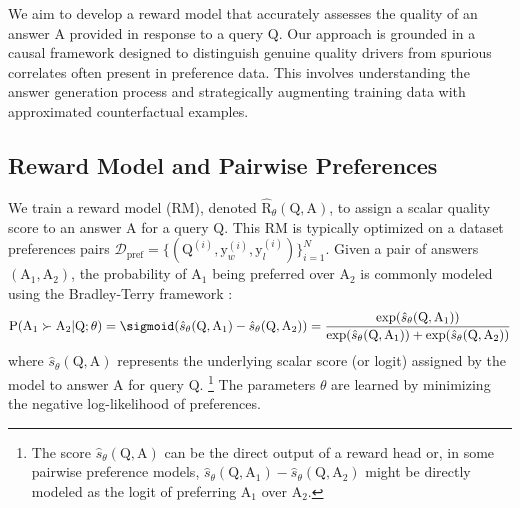 
\vspace{-0.05in}
We aim to develop a reward model that accurately assesses the quality of an answer $\mathrm{A}$ provided in response to a query $\mathrm{Q}$. Our approach is grounded in a causal framework designed to distinguish genuine quality drivers from spurious correlates often present in preference data. This involves understanding the answer generation process and strategically augmenting training data with approximated counterfactual examples.

\vspace{-0.1in}
\subsection{Reward Model and Pairwise Preferences}
We train a reward model (RM), denoted $\hat{\mathrm{R}}_\theta(\mathrm{Q}, \mathrm{A})$, to assign a scalar quality score to an answer $\mathrm{A}$ for a query $\mathrm{Q}$. This RM is typically optimized on a dataset  preferences pairs $\mathcal{D}_{\mathrm{pref}} = \{(\mathrm{Q}^{(i)}, \mathrm{y}_w^{(i)}, \mathrm{y}_l^{(i)})\}_{i=1}^N$. Given a pair of answers $(\mathrm{A}_1, \mathrm{A}_2)$, the probability of $\mathrm{A}_1$ being preferred over $\mathrm{A}_2$ is commonly modeled using the Bradley-Terry framework \citep{bradley1952rank}:
\begin{equation}
\mathrm{P}(\mathrm{A}_1 \succ \mathrm{A}_2 | \mathrm{Q}; \theta) = \sigmoid(\hat{s}_\theta(\mathrm{Q}, \mathrm{A}_1) - \hat{s}_\theta(\mathrm{Q}, \mathrm{A}_2)) = \frac{\exp(\hat{s}_\theta(\mathrm{Q}, \mathrm{A}_1))}{\exp(\hat{s}_\theta(\mathrm{Q}, \mathrm{A}_1)) + \exp(\hat{s}_\theta(\mathrm{Q}, \mathrm{A}_2))}
\label{eq:bt_prob_roman}
\end{equation}
where $\hat{s}_\theta(\mathrm{Q}, \mathrm{A})$ represents the underlying scalar score (or logit) assigned by the model to answer $\mathrm{A}$ for query $\mathrm{Q}$. \footnote{The score $\hat{s}_\theta(\mathrm{Q}, \mathrm{A})$ can be the direct output of a reward head or, in some pairwise preference models, $\hat{s}_\theta(\mathrm{Q}, \mathrm{A}_1) - \hat{s}_\theta(\mathrm{Q}, \mathrm{A}_2)$ might be directly modeled as the logit of preferring $\mathrm{A}_1$ over $\mathrm{A}_2$.} The parameters $\theta$ are learned by minimizing the negative log-likelihood of  preferences.

